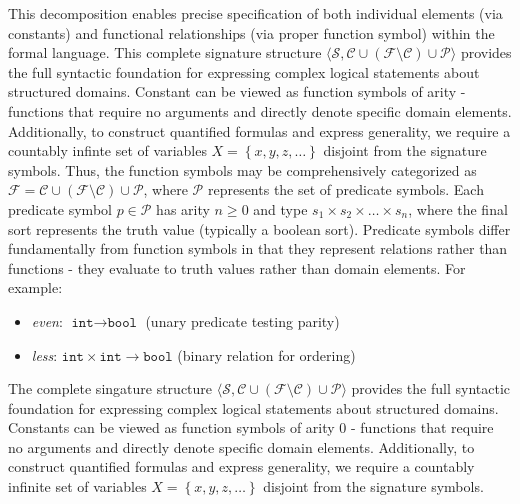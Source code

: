 \documentclass[a4paper]{article}
\theoremstyle{definition}
\begin{document}
This decomposition enables precise specification of both individual elements (via constants) and functional relationships 
(via proper function symbol) within the formal language.
\vspace{1em}
\noindent
\newline
This complete signature structure \( \langle \mathcal{S}, \mathcal{C} \cup (\mathcal{F} \setminus \mathcal{C}) \cup \mathcal{P} \rangle \) provides 
the full syntactic foundation for expressing complex logical statements about structured domains.
\vspace{1em}
\noindent
\newline
Constant can be viewed as function symbols of arity - functions that require no arguments and directly denote specific domain elements.
Additionally, to construct quantified formulas and express generality, we require a countably infinte set of variables \( X = \left\{x,y,z,\ldots \right\} \) disjoint
from the signature symbols.
\vspace{1em}
\noindent
\newline
Thus, the function symbols may be comprehensively categorized as \( \mathcal{F} = \mathcal{C} \cup ( \mathcal{F} \setminus \mathcal{C}) \cup \mathcal{P} \), where 
\( \mathcal{P} \) represents the set of predicate symbols. Each predicate symbol \( p \in \mathcal{P} \) has arity \( n \geq 0 \) and 
type \( s_1 \times s_2 \times \ldots \times s_n \), where the final sort represents the truth value (typically a boolean sort).
\vspace{1em}
\noindent
\newline
Predicate symbols differ fundamentally from function symbols in that they represent relations 
rather than functions - they evaluate to truth values rather than domain elements. For example:
\begin{itemize}
	\item \textit{even}: \( \texttt{int} \rightarrow \texttt{bool} \) (unary predicate testing parity)
	\item \textit{less}: \( \texttt{int} \times \texttt{int} \rightarrow \texttt{bool} \) (binary relation for ordering)
\end{itemize}
The complete singature structure \( \langle \mathcal{S}, \mathcal{C} \cup (\mathcal{F} \setminus \mathcal{C}) \cup \mathcal{P} \rangle \) provides the full syntactic foundation for expressing 
complex logical statements about structured domains.
\vspace{1em}
\noindent
\newline
Constants can be viewed as function symbols of arity 0 - functions that require no arguments and directly denote 
specific domain elements. Additionally, to construct quantified formulas and express generality, we require a countably 
infinite set of variables \( X = \left\{ x,y,z, \ldots \right\} \) disjoint from the signature symbols.
\end{document}
